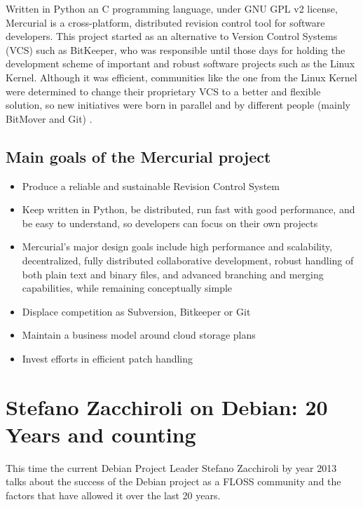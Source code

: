 \documentclass[11pt]{article} %
\begin{document}
Written in Python an C programming language, under GNU GPL v2 license, Mercurial is a cross-platform, distributed revision control tool for software developers. This project started as an alternative to Version Control Systems (VCS) such as BitKeeper, who was responsible until those days for holding the development scheme of important and robust software projects such as the Linux Kernel. Although it was efficient, communities like the one from the Linux Kernel were determined to change their proprietary VCS to a better and flexible solution, so new initiatives were born in parallel and by different people (mainly BitMover and Git) \cite{Mackall:2006mm}.

\subsection{Main goals of the Mercurial project}

  	\begin{itemize}
  	  \item Produce a reliable and sustainable Revision Control System
  	  \item Keep written in Python, be distributed, run fast with good performance, and be easy to understand, so developers can focus on their own projects
  	  \item Mercurial's major design goals include high performance and scalability, decentralized, fully distributed collaborative development, robust handling of both plain text and binary files, and advanced branching and merging capabilities, while remaining conceptually simple
  	  \item Displace competition as Subversion, Bitkeeper or Git
  	  \item Maintain a business model around cloud storage plans
  	  \item Invest efforts in efficient patch handling
  	\end{itemize}

\section{Stefano Zacchiroli on Debian: 20 Years and counting}

This time the current Debian Project Leader Stefano Zacchiroli by year 2013 talks about the success of the Debian project as a FLOSS community and the factors that have allowed it over the last 20 years.
\end{document}
